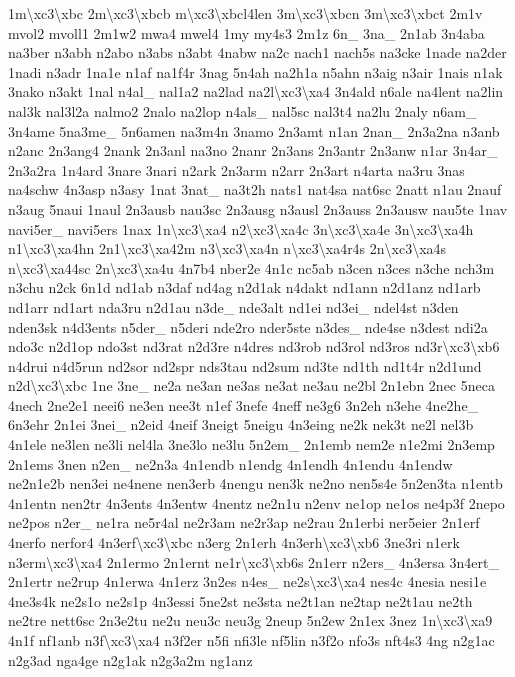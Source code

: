 {1m\textbackslash{}xc3\textbackslash{}xbc 2m\textbackslash{}xc3\textbackslash{}xbcb m\textbackslash{}xc3\textbackslash{}xbcl4len 3m\textbackslash{}xc3\textbackslash{}xbcn 3m\textbackslash{}xc3\textbackslash{}xbct 2m1v mvol2 mvoll1 2m1w2 mwa4 mwel4 1my my4s3 2m1z 6n\-\_\- 3na\-\_\- 2n1ab 3n4aba na3ber n3abh n2abo n3abs n3abt 4nabw na2c nach1 nach5s na3cke 1nade na2der 1nadi n3adr 1na1e n1af na1f4r 3nag 5n4ah na2h1a n5ahn n3aig n3air 1nais n1ak 3nako n3akt 1nal n4al\-\_\- nal1a2 na2lad na2l\textbackslash{}xc3\textbackslash{}xa4 3n4ald n6ale na4lent na2lin nal3k nal3l2a nalmo2 2nalo na2lop n4als\-\_\- nal5sc nal3t4 na2lu 2naly n6am\-\_\- 3n4ame 5na3me\-\_\- 5n6amen na3m4n 3namo 2n3amt n1an 2nan\-\_\- 2n3a2na n3anb n2anc 2n3ang4 2nank 2n3anl na3no 2nanr 2n3ans 2n3antr 2n3anw n1ar 3n4ar\-\_\- 2n3a2ra 1n4ard 3nare 3nari n2ark 2n3arm n2arr 2n3art n4arta na3ru 3nas na4schw 4n3asp n3asy 1nat 3nat\-\_\- na3t2h nats1 nat4sa nat6sc 2natt n1au 2nauf n3aug 5naui 1naul 2n3ausb nau3sc 2n3ausg n3ausl 2n3auss 2n3ausw nau5te 1nav navi5er\-\_\- navi5ers 1nax 1n\textbackslash{}xc3\textbackslash{}xa4 n2\textbackslash{}xc3\textbackslash{}xa4c 3n\textbackslash{}xc3\textbackslash{}xa4e 3n\textbackslash{}xc3\textbackslash{}xa4h n1\textbackslash{}xc3\textbackslash{}xa4hn 2n1\textbackslash{}xc3\textbackslash{}xa42m n3\textbackslash{}xc3\textbackslash{}xa4n n\textbackslash{}xc3\textbackslash{}xa4r4s 2n\textbackslash{}xc3\textbackslash{}xa4s n\textbackslash{}xc3\textbackslash{}xa44sc 2n\textbackslash{}xc3\textbackslash{}xa4u 4n7b4 nber2e 4n1c nc5ab n3cen n3ces n3che nch3m n3chu n2ck 6n1d nd1ab n3daf nd4ag n2d1ak n4dakt nd1ann n2d1anz nd1arb nd1arr nd1art nda3ru n2d1au n3de\-\_\- nde3alt nd1ei nd3ei\-\_\- ndel4st n3den nden3sk n4d3ents n5der\-\_\- n5deri nde2ro nder5ste n3des\-\_\- nde4se n3dest ndi2a ndo3c n2d1op ndo3st nd3rat n2d3re n4dres nd3rob nd3rol nd3ros nd3r\textbackslash{}xc3\textbackslash{}xb6 n4drui n4d5run nd2sor nd2spr nds3tau nd2sum nd3te nd1th nd1t4r n2d1und n2d\textbackslash{}xc3\textbackslash{}xbc 1ne 3ne\-\_\- ne2a ne3an ne3as ne3at ne3au ne2bl 2n1ebn 2nec 5neca 4nech 2ne2e1 neei6 ne3en nee3t n1ef 3nefe 4neff ne3g6 3n2eh n3ehe 4ne2he\-\_\- 6n3ehr 2n1ei 3nei\-\_\- n2eid 4neif 3neigt 5neigu 4n3eing ne2k nek3t ne2l nel3b 4n1ele ne3len ne3li nel4la 3ne3lo ne3lu 5n2em\-\_\- 2n1emb nem2e n1e2mi 2n3emp 2n1ems 3nen n2en\-\_\- ne2n3a 4n1endb n1endg 4n1endh 4n1endu 4n1endw ne2n1e2b nen3ei ne4nene nen3erb 4nengu nen3k ne2no nen5s4e 5n2en3ta n1entb 4n1entn nen2tr 4n3ents 4n3entw 4nentz ne2n1u n2env ne1op ne1os ne4p3f 2nepo ne2pos n2er\-\_\- ne1ra ne5r4al ne2r3am ne2r3ap ne2rau 2n1erbi ner5eier 2n1erf 4nerfo nerfor4 4n3erf\textbackslash{}xc3\textbackslash{}xbc n3erg 2n1erh 4n3erh\textbackslash{}xc3\textbackslash{}xb6 3ne3ri n1erk n3erm\textbackslash{}xc3\textbackslash{}xa4 2n1ermo 2n1ernt ne1r\textbackslash{}xc3\textbackslash{}xb6s 2n1err n2ers\-\_\- 4n3ersa 3n4ert\-\_\- 2n1ertr ne2rup 4n1erwa 4n1erz 3n2es n4es\-\_\- ne2s\textbackslash{}xc3\textbackslash{}xa4 nes4c 4nesia nesi1e 4ne3s4k ne2s1o ne2s1p 4n3essi 5ne2st ne3sta ne2t1an ne2tap ne2t1au ne2th ne2tre nett6sc 2n3e2tu ne2u neu3c neu3g 2neup 5n2ew 2n1ex 3nez 1n\textbackslash{}xc3\textbackslash{}xa9 4n1f nf1anb n3f\textbackslash{}xc3\textbackslash{}xa4 n3f2er n5fi nfi3le nf5lin n3f2o nfo3s nft4s3 4ng n2g1ac n2g3ad nga4ge n2g1ak n2g3a2m ng1anz }
